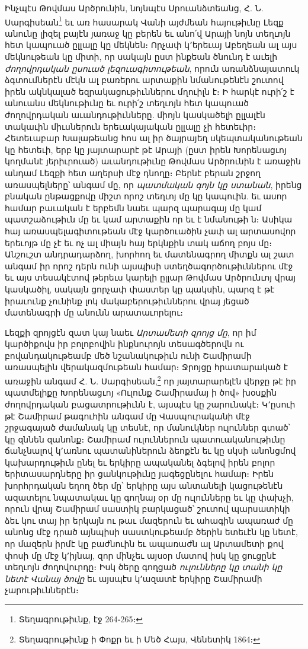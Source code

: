 \documentclass{article}
\begin{document}
{Ինչպէս Թովմաս Արծրունին, նոյնպէս Սրուանձտեանց, Հ. Ն. Սարգիսեան\footnote{Տեղագրութիւնք, էջ 264֊265։} եւ առ հասարակ Վանի այժմեան հայութիւնը Լեզք անունը լիզել բայէն յառաջ կը բերեն եւ անո՛վ Արայի նոյն տեղւոյն հետ կապուած ըլլալը կը մեկնեն։ Որչափ կ՚երեւայ Աբեղեան ալ այս մեկնութեան կը միտի, որ սակայն ըստ ինքեան ծնունդ է աւելի \emph{ժողովրդական ըսուած լեզուագիտութեան}, որուն առանձնայատուկ ձգտումներէն մէկն ալ բառերու արտաքին նմանութենէն շուտով իրեն ակնկալած եզրակացութիւններու մղուիլն է։ Ի հարկէ ուրի՛շ է անուանս մեկնութիւնը եւ ուրի՛շ տեղւոյն հետ կապուած ժողովրդական աւանդութիւնները. միոյն կասկածելի ըլլալէն տակաւին միւսներուն երեւակայական ըլլալը չի հետեւիր։ Հետեւաբար Խալաթեանց հոս ալ իր ծայրայեղ սկեպտականութեան կը հետեւի, երբ կը յայտարարէ թէ Արայի (ըստ իրեն Խորենացւոյ կողմանէ յերիւրուած) աւանդութիւնը Թովմաս Արծրունին է առաջին անդամ Լեզքի հետ աղերսի մէջ դնողը։ Բերնէ բերան շրջող առասպելները՝ անգամ մը, որ \emph{պատմական գոյն կը ստանան}, իրենց բնական ընթացքովը միշտ որոշ տեղւոյ մը կը կապուին. եւ ասոր համար բաւական է երբեմն նաեւ պարզ պարագայ մը կամ պատշաձութիւն մը եւ կամ արտաքին որ եւ է նմանութի ն։ Ասիկա հայ առասպելագիտութեան մէջ կարծուածին չափ ալ արտասովոր երեւոյթ մը չէ եւ ոչ ալ միայն հայ երկնքին տակ աճող բոյս մը։ Անշուշտ անդրադարձող, խորհող եւ մատենագրող միտքն ալ շատ անգամ իր որոշ դերն ունի այսպիսի ստեղծագործութիւններու մէջ եւ այս տեսակէտով թերեւս կարելի ըլլար Թովմաս Արծրունւոյ վրայ կասկածիլ, սակայն ցորչափ փաստեր կը պակսին, պարզ է թէ իրաւունք չունինք լոկ մակաբերութիւններու վրայ յեցած մատենագրի մը անունն արատաւորելու։

Լեզքի զրոյցէն զատ կայ նաեւ \emph{Արտամետի զրոյց մը}, որ իմ կարծիքովս իր բոլոբովին ինքնուրոյն տեսագծերովն ու բովանդակութեամբ մեծ նշանակութիւն ունի Շամիրամի առասպելին վերակազմութեան համար։ Ջրոյցը հրատարակած է առաջին անգամ Հ. Ն. Սարգիսեան,\footnote{Տեղագրութիւնք ի Փոքր եւ ի Մեծ Հայս, Վենետիկ 1864։} որ յայտարարելէն վերջը թէ իր պատմելիքը Խորենացւոյ «Ուլունք Շամիրամայ ի ծով» խօսքին ժողովրդական բացատրութիւնն է, այսպէս կը շարունակէ։ Կ՚ըսուի թէ Շամիրամ թագուհին անգամ մը Վասպուրականի մէջ շրջագայած ժամանակ կը տեսնէ, որ մանուկներ ուլուններ գտած՝ կը զննեն զանոնք։ Շամիրամ ուլուններուն պատուականութիւնը ճանչնալով կ՚առնու պատանիներուն ձեոքէն եւ կը սկսի անոնցմով կախարդութիւն ընել եւ երկիրը ապականել ձգելով իրեն բոլոր երիտասարդները իր ցանկութիւնը յագեցընելու համար։ Իրեն խորհրդական եղող ծեր մը՝ երկիրը այս անտանելի կացութենէն ազատելու նպատակաւ կը գողնայ օր մը ուլունները եւ կը փախչի, որուն վրայ Շամիրամ սաստիկ բարկացած՝ շուտով պարսատիկի ձեւ կու տայ իր երկայն ու թաւ մազերուն եւ ահագին ապառաժ մը անոնց մէջ դրած այնպիսի սաստկութեամբ ծերին ետեւէն կը նետէ, որ մազերն իրմէ կը բաժնուին եւ ապառաժն ալ Արտամետի քով փոսի մը մէջ կ՚իյնայ, զոր մինչեւ այսօր մատով իսկ կը ցուցընէ տեղւոյն ժողովուրդը։ Իսկ ծերը գողցած \emph{ուլունները կը տանի կը նետէ Վանայ ծովը} եւ այսպէս կ՚ազատէ երկիրը Շամիրամի չարութիւններէն։

}
\end{document}
